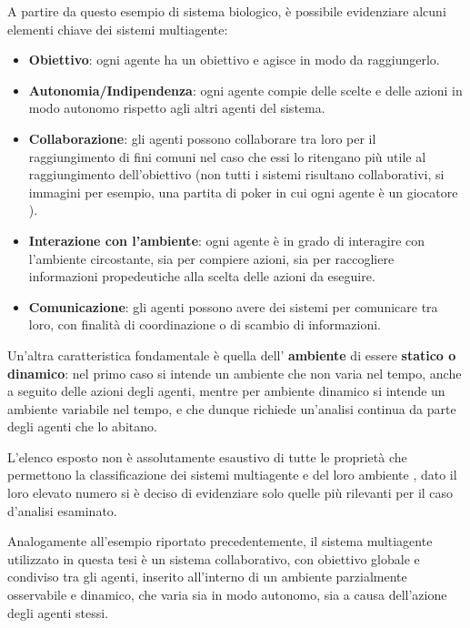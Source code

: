 A partire da questo esempio di sistema biologico, è possibile evidenziare alcuni elementi chiave dei sistemi multiagente:
\begin{itemize}

\item \textbf{Obiettivo}:
ogni agente ha un obiettivo e agisce in modo da raggiungerlo.

\item \textbf{Autonomia/Indipendenza}:
ogni agente compie delle scelte e delle azioni in modo autonomo rispetto agli altri agenti del sistema.

\item \textbf{Collaborazione}:
gli agenti possono collaborare tra loro per il raggiungimento di fini comuni nel caso che essi lo ritengano più utile al raggiungimento dell'obiettivo (non tutti i sistemi risultano collaborativi, si immagini per esempio, una partita di poker in cui ogni agente è un giocatore \cite{RussellStuartJ2022Ai:a}).

\item \textbf{Interazione con l'ambiente}:
ogni agente è in grado di interagire con l'ambiente circostante, sia per compiere azioni, sia per raccogliere informazioni propedeutiche alla scelta delle azioni da eseguire.

\item \textbf{Comunicazione}:
gli agenti possono avere dei sistemi per comunicare tra loro, con finalità di coordinazione o di scambio di informazioni.

\end{itemize}

Un'altra caratteristica fondamentale è quella dell' \textbf{ambiente} di essere \textbf{statico o dinamico}: nel primo caso si intende un ambiente che non varia nel tempo, anche a seguito delle azioni degli agenti, mentre per ambiente dinamico si intende un ambiente variabile nel tempo, e che dunque richiede un'analisi continua da parte degli agenti che lo abitano.

L'elenco esposto non è assolutamente esaustivo di tutte le proprietà che permettono la classificazione dei sistemi multiagente e del loro ambiente \cite{RussellStuartJ2022Ai:a}, dato il loro elevato numero si è deciso di evidenziare solo quelle più rilevanti per il caso d'analisi esaminato.

Analogamente all'esempio riportato precedentemente, il sistema multiagente utilizzato in questa tesi è un sistema collaborativo, con obiettivo globale e condiviso tra gli agenti, inserito all'interno di un ambiente parzialmente osservabile e dinamico, che varia sia in modo autonomo, sia a causa dell'azione degli agenti stessi.
